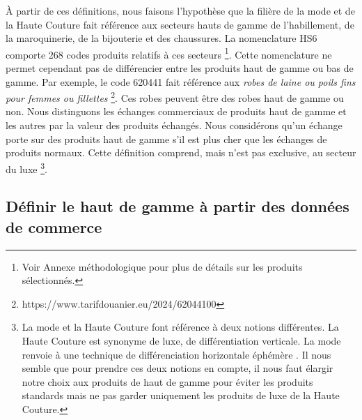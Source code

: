 \documentclass[french,10pt,a4paper]{article}
\begin{document}
À partir de ces définitions, nous faisons l'hypothèse que la filière de la mode et de la Haute Couture fait référence aux secteurs hauts de gamme de l'habillement, de la maroquinerie, de la bijouterie et des chaussures. La nomenclature HS6 comporte 268 codes produits relatifs à ces secteurs \footnote{Voir Annexe méthodologique pour plus de détails sur les produits sélectionnés.}. Cette nomenclature ne permet cependant pas de différencier entre les produits haut de gamme ou bas de gamme. Par exemple, le code 620441 fait référence aux \textit{\og robes de laine ou poils fins pour femmes ou fillettes \fg{}} \footnote{https://www.tarifdouanier.eu/2024/62044100}. Ces robes peuvent être des robes haut de gamme ou non. Nous distinguons les échanges commerciaux de produits haut de gamme et les autres par la valeur des produits échangés. Nous considérons qu'un échange porte sur des produits haut de gamme s'il est plus cher que les échanges de produits \og normaux\fg{}. Cette définition comprend, mais n'est pas exclusive, au secteur du luxe \footnote{La mode et la Haute Couture font référence à deux notions différentes. La Haute Couture est synonyme de luxe, de différentiation verticale. La mode renvoie à une technique de différenciation horizontale éphémère \citep{Agogue2010}. Il nous semble que pour prendre ces deux notions en compte, il nous faut élargir notre choix aux produits de haut de gamme pour éviter les produits \og standards\fg{} mais ne pas garder uniquement les produits de luxe de la Haute Couture.}.

\subsection{Définir le haut de gamme à partir des données de commerce}
\end{document}
